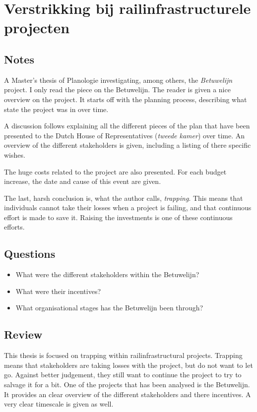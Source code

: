 \chapter{Verstrikking bij railinfrastructurele projecten \cite{de2012verstrikking}}
\section{Notes}
A Master's thesis of Planologie investigating, among others, the \emph{Betuwelijn} project.
I only read the piece on the Betuwelijn.
The reader is given a nice overview on the project.
It starts off with the planning process, describing what state the project was in over time.

A discussion follows explaining all the different pieces of the plan that have been presented to the Dutch House of Representatives (\emph{tweede kamer}) over time.
An overview of the different stakeholders is given, including a listing of there specific wishes.

The huge costs related to the project are also presented. 
For each budget increase, the date and cause of this event are given. 

The last, harsh conclusion is, what the author calls, \emph{trapping}.
This means that individuals cannot take their losses when a project is failing, and that continuous effort is made to save it. 
Raising the investments is one of these continuous efforts.

\section{Questions}
\begin{itemize}
  \item What were the different stakeholders within the Betuwelijn?
  \item What were their incentives?
  \item What organisational stages has the Betuwelijn been through?
\end{itemize}

\section{Review}
This thesis is focused on trapping within railinfrastructural projects. 
Trapping means that stakeholders are taking losses with the project, but do not want to let go. 
Against better judgement, they still want to continue the project to try to salvage it for a bit. 
One of the projects that has been analysed is the Betuwelijn. 
It provides an clear overview of the different stakeholders and there incentives. 
A very clear timescale is given as well.
